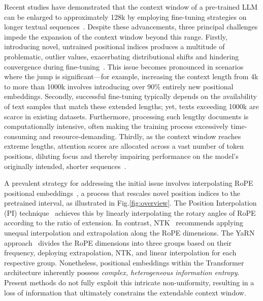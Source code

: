 Recent studies have demonstrated that the context window of a pre-trained LLM can be enlarged to approximately 128k by employing fine-tuning strategies on longer textual sequences~\cite{longlora,pi,yarn,zhang2024soaring,liu2023scaling}. Despite these advancements, three principal challenges impede the expansion of the context window beyond this range. Firstly, introducing novel, untrained positional indices produces a multitude of problematic, outlier values, exacerbating distributional shifts and hindering convergence during fine-tuning~\cite{pi}. This issue becomes pronounced in scenarios where the jump is significant—for example, increasing the context length from 4k to more than 1000k involves introducing over 90\% entirely new positional embeddings. Secondly, successful fine-tuning typically depends on the availability of text samples that match these extended lengths; yet, texts exceeding 1000k are scarce in existing datasets. Furthermore, processing such lengthy documents is computationally intensive, often making the training process excessively time-consuming and resource-demanding. Thirdly, as the context window reaches extreme lengths, attention scores are allocated across a vast number of token positions, diluting focus and thereby impairing performance on the model's originally intended, shorter sequences~\cite{pi}.

A prevalent strategy for addressing the initial issue involves interpolating RoPE positional embeddings~\cite{rope,pi}, a process that rescales novel position indices to the pretrained interval, as illustrated in Fig.\ref{fig:overview}. The Position Interpolation (PI) technique~\cite{pi} achieves this by linearly interpolating the rotary angles of RoPE according to the ratio of extension. In contrast, NTK~\cite{ntk,dynamicntk} recommends applying unequal interpolation and extrapolation along the RoPE dimensions. The YaRN approach~\cite{yarn} divides the RoPE dimensions into three groups based on their frequency, deploying extrapolation, NTK, and linear interpolation for each respective group. Nonetheless, positional embeddings within the Transformer architecture inherently possess \emph{complex, heterogeneous information entropy}. Present methods do not fully exploit this intricate non-uniformity, resulting in a loss of information that ultimately constrains the extendable context window.

